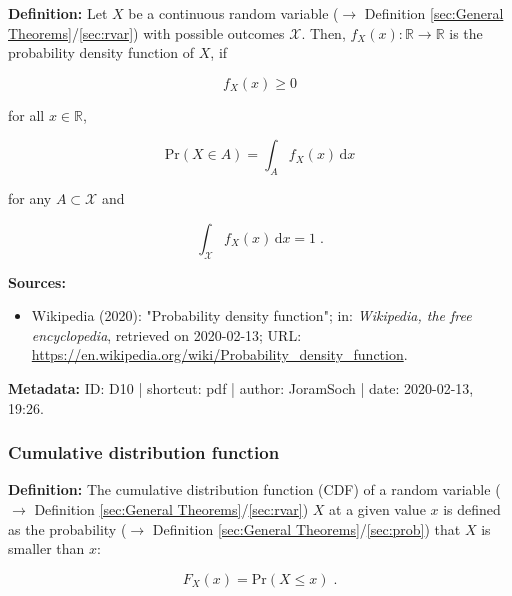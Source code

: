 \documentclass[a4paper,12pt,twoside]{book}
\begin{document}
\textbf{Definition:} Let $X$ be a continuous random variable ($\rightarrow$ Definition \ref{sec:General Theorems}/\ref{sec:rvar}) with possible outcomes $\mathcal{X}$. Then, $f_X(x): \mathbb{R} \to \mathbb{R}$ is the probability density function of $X$, if

\begin{equation} \label{eq:pdf-pdf-def-s0}
f_X(x) \geq 0
\end{equation}

for all $x \in \mathbb{R}$,

\begin{equation} \label{eq:pdf-pdf-def-s1}
\mathrm{Pr}(X \in A) = \int_{A} f_X(x) \, \mathrm{d}x
\end{equation}

for any $A \subset \mathcal{X}$ and

\begin{equation} \label{eq:pdf-pdf-def-s2}
\int_{\mathcal{X}} f_X(x) \, \mathrm{d}x = 1 \; .
\end{equation}


\vspace{1em}
\textbf{Sources:}
\begin{itemize}
\item Wikipedia (2020): "Probability density function"; in: \textit{Wikipedia, the free encyclopedia}, retrieved on 2020-02-13; URL: \url{https://en.wikipedia.org/wiki/Probability_density_function}.
\end{itemize}


\vspace{1em}
\textbf{Metadata:} ID: D10 | shortcut: pdf | author: JoramSoch | date: 2020-02-13, 19:26.
\vspace{1em}



\subsubsection[\textit{Cumulative distribution function}]{Cumulative distribution function} \label{sec:cdf}
\setcounter{equation}{0}

\textbf{Definition:} The cumulative distribution function (CDF) of a random variable ($\rightarrow$ Definition \ref{sec:General Theorems}/\ref{sec:rvar}) $X$ at a given value $x$ is defined as the probability ($\rightarrow$ Definition \ref{sec:General Theorems}/\ref{sec:prob}) that $X$ is smaller than $x$:

\begin{equation} \label{eq:cdf-cdf}
F_X(x) = \mathrm{Pr}(X \leq x) \; .
\end{equation}
\end{document}
